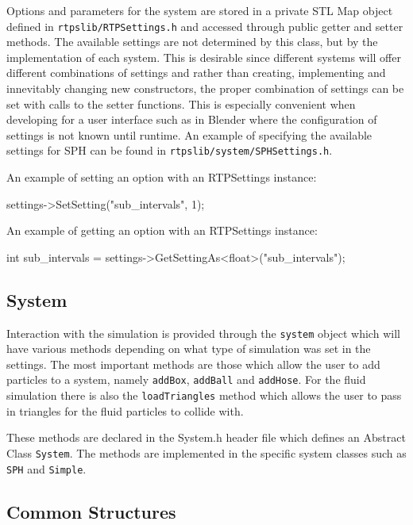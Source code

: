 Options and parameters for the system are stored in a private STL Map object
defined in \verb|rtpslib/RTPSettings.h| and accessed through public getter and
setter methods. The available settings are not determined by this class, but by
the implementation of each system. This is desirable since different systems
will offer different combinations of settings and rather than creating,
implementing and innevitably changing new constructors, the proper combination
of settings can be set with calls to the setter functions. This is especially
convenient when developing for a user interface such as in Blender where the
configuration of settings is not known until runtime.  
An example of specifying the available settings for SPH can be found in
\verb|rtpslib/system/SPHSettings.h|.


An example of setting an option with an RTPSettings instance:
\begin{cppcode}{0}
settings->SetSetting("sub_intervals", 1);
\end{cppcode}

An example of getting an option with an RTPSettings instance:
\begin{cppcode}{0}
int sub_intervals =  settings->GetSettingAs<float>("sub_intervals");
\end{cppcode}

\subsection{System}

Interaction with the simulation is provided through the \verb|system| object which
will have various methods depending on what type of simulation was set in the
settings. The most important methods are those which allow the user to add
particles to a system, namely \verb|addBox|, \verb|addBall| and \verb|addHose|. For the fluid
simulation there is also the \verb|loadTriangles| method which allows the user to
pass in triangles for the fluid particles to collide with.

These methods are declared in the System.h header file which defines an
Abstract Class \verb|System|. The methods are implemented in the specific system
classes such as \verb|SPH| and \verb|Simple|.

\subsection{Common Structures}


